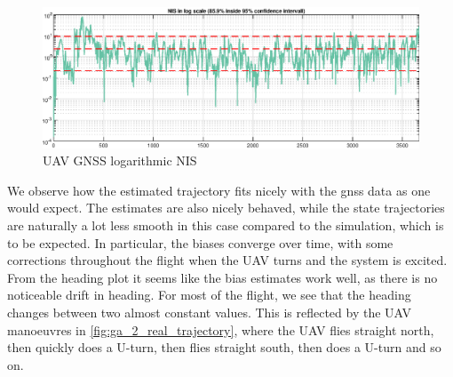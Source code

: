 \begin{figure}[!htb]
    \centering
    \includegraphics[width=0.7\linewidth]{figures/ga_2/real_consistency.eps}
    \caption{UAV GNSS logarithmic NIS}
    \label{fig:ga_2_real_consistency}
\end{figure}

We observe how the estimated trajectory fits nicely with the \acrshort{gnss} data as one would expect. The estimates are also nicely behaved, while the state trajectories are naturally a lot less smooth in this case compared to the simulation, which is to be expected. In particular, the biases converge over time, with some corrections throughout the flight when the UAV turns and the system is excited. From the heading plot it seems like the bias estimates work well, as there is no noticeable drift in heading. For most of the flight, we see that the heading changes between two almost constant values. This is reflected by the UAV manoeuvres in \cref{fig:ga_2_real_trajectory}, where the UAV flies straight north, then quickly does a U-turn, then flies straight south, then does a U-turn and so on. 

